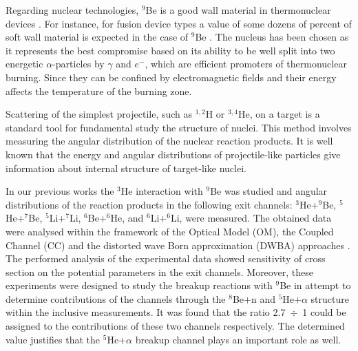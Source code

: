 \documentclass[10pt]{iopart}
\begin{document}
Regarding nuclear technologies, $^9$Be is a good wall material in thermonuclear devices \cite{kukulin2010, seksembayev2018}.
For instance, for fusion device types a value of some dozens of percent of soft wall material is expected in the case of $^9$Be \cite{seksembayev2018}. 
The nucleus  has been chosen as it represents the best compromise based  on its ability to be well split into two energetic $\alpha$-particles by $\gamma$ and $e^-$, which are efficient promoters of thermonuclear burning. Since they can be confined by electromagnetic fields and their energy affects the temperature of the burning zone.

	Scattering of the simplest projectile, such as $^{1,2}$H or $^{3,4}$He, on a target is a standard tool for fundamental study the structure of nuclei. 
	This method involves measuring the angular distribution of the nuclear reaction products.
	It is well known that the energy and angular distributions of projectile-like particles give information about internal structure of target-like nuclei.
	
	In our previous works \cite{lukyanov2014, lukyanov2015, janseitov2018} the $^3$He interaction with $^9$Be was studied and angular distributions of the reaction products in the following exit channels: $^3$He+$^9$Be, $^5$He+$^7$Be, $^5$Li+$^7$Li, $^6$Be+$^6$He, and $^6$Li+$^6$Li, were measured. The obtained data were analysed within the framework of the Optical Model (OM), the Coupled Channel (CC) and the distorted wave Born approximation (DWBA) approaches  . 
	The performed analysis of the experimental data showed  sensitivity of cross section on the potential parameters in the exit channels. 
	Moreover, these experiments were designed to study the breakup reactions with $^9$Be in attempt to determine contributions of the channels through the $^8$Be+n  and  $^5$He+$\alpha$ structure within the inclusive measurements.
	It was found that the ratio 2.7~$\div$~1 could be assigned to the contributions of these two channels respectively. The determined value justifies that the $^5$He+$\alpha$ breakup channel plays an important role as well. 
\end{document}
